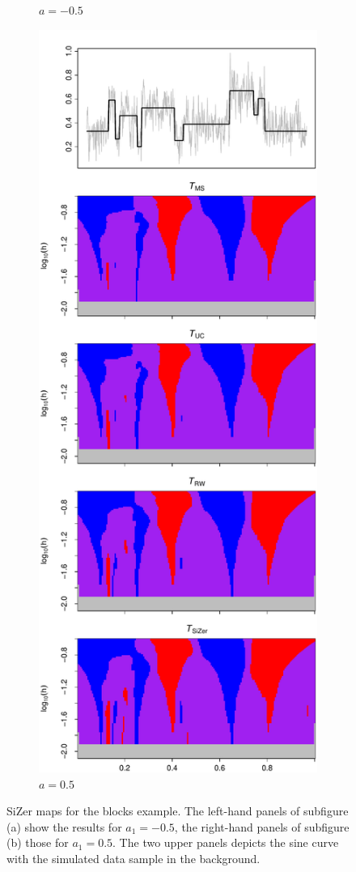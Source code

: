 \begin{figure}[p]
\begin{subfigure}[b]{0.475\textwidth}
\caption{$a=-0.5$}
\end{subfigure}
\hspace{0.25cm}
\begin{subfigure}[b]{0.475\textwidth}
\includegraphics[width=\textwidth]{Plots/SiZer_map_T_1000_blocks_a1_50.pdf}
\caption{$a=0.5$}
\end{subfigure}
\caption{SiZer maps for the blocks example. The left-hand panels of subfigure (a) show the results for $a_1=-0.5$, the right-hand panels of subfigure (b) those for $a_1=0.5$. The two upper panels depicts the sine curve with the simulated data sample in the background.}\label{fig:sizer:blocks}
\end{figure}


